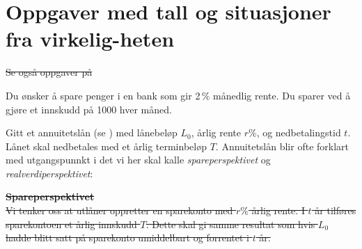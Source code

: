 



	
\section [Oppgaver med tall og situasjoner fra virkeligheten]{Oppgaver med tall og situasjoner fra virkelig-heten}	
\st{Se også oppgaver på }
\linje

Du ønsker å spare penger i en bank som gir 2\,\% månedlig rente. Du sparer ved å gjøre et innskudd på 1000 hver måned.
\newpage

Gitt et annuitetslån (se \am)  med lånebeløp $ L_0 $, årlig rente $ r\% $, og nedbetalingstid $ t $. Lånet skal nedbetales med et årlig terminbeløp $ T $. 
Annuitetslån blir ofte forklart med utgangspunnkt i det vi her skal kalle \textit{spareperspektivet} og \textit{realverdiperspektivet}: \os

\st{
\textbf{Spareperspektivet}\\
Vi tenker oss at utlåner oppretter en sparekonto med $ r\% $ årlig rente. I $ t $ år tilføres sparekontoen et årlig innskudd $ T $. Dette skal gi samme resultat som hvis $ L_0 $ hadde blitt satt på sparekonto umiddelbart og forrentet i $ t $ år.
} 


